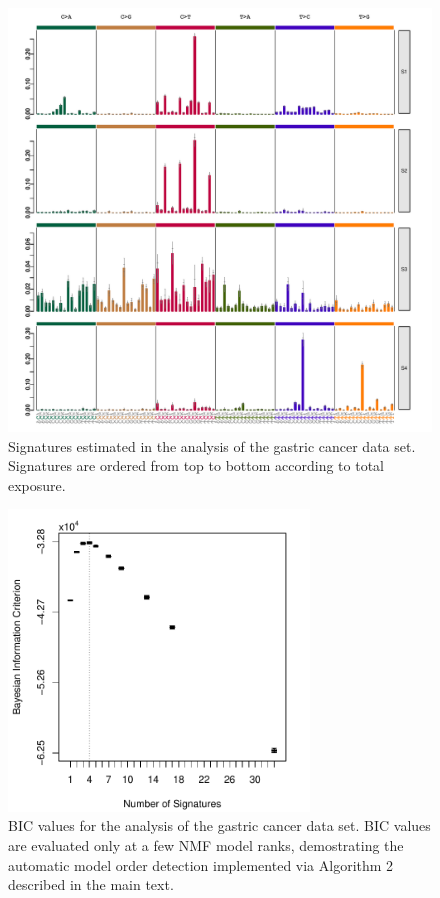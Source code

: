 \documentclass[11pt]{amsart}
\theoremstyle{definition}
\begin{document}
\begin{center}
\begin{figure}
  \includegraphics[width=16cm]{sfigs/Signatures_so_lauren_opp}
  \caption{Signatures estimated in the analysis of the gastric cancer
    data set. Signatures are ordered from top to bottom according to
    total exposure.}\label{fig:Sig_Lauren}
\end{figure}
\end{center}

\begin{center}
\begin{figure}
  \includegraphics[width=8cm]{sfigs/BICs_so_Lauren_opp_full_run}
  \caption{BIC values for the analysis of the gastric cancer data
    set. BIC values are evaluated only at a few NMF model ranks,
    demostrating the automatic model order detection implemented via  Algorithm 2 described in the main text.}\label{fig:BICS_Lauren}
\end{figure}
\end{center}
\end{document}
